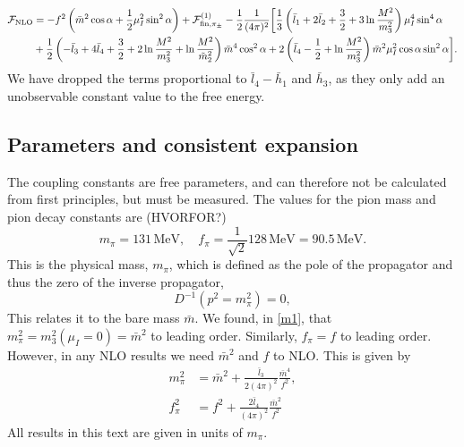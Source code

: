 \begin{align}
    \nonumber
    \Ef_{\mathrm{NLO}} &=
    - f^2 \left(\bar m^2 \cos \alpha + \frac{1}{2}\mu_I^2 \sin^2 \alpha\right)
    + \Ef^{(1)}_{\mathrm{fin}, \pi_\pm}
    - \frac{1}{2}\frac{1}{(4 \pi)^2}
    \bigg[
        \frac{1}{3}
        \left( 
            \bar l_1 + 2 \bar l_2 + \frac{3}{2} + 3 \ln \frac{M^2}{m_3^2}
        \right) \mu_I^4 \sin^4 \alpha
        \\ %
        &
        +
        \frac{1}{2}
        \left(
            - \bar l_3 + 4 \bar l_4 + \frac{3}{2} + 2\ln \frac{M^2}{m_3^2}
            + \ln \frac{M^2}{\tilde m^2_2}
        \right) \bar m^4 \cos^2\alpha 
        + 2 \left(\bar l_4 - \frac{1}{2} + \ln \frac{M^2}{m_3^2}\right)
        \bar m^2 \mu_I^2 \cos\alpha \sin^2 \alpha
        \label{NLO free energy}
    \bigg].
\end{align}
We have dropped the terms proportional to $\bar l_4 - \bar h_1$ and $\bar h_3$, as they only add an unobservable constant value to the free energy.



\subsection*{Parameters and consistent expansion}
The coupling constants are free parameters, and can therefore not be calculated from first principles, but must be measured.
The values for the pion mass and pion decay constants are (HVORFOR?)
\begin{equation}
    m_\pi = 131 \, \mathrm{MeV}, \quad 
    f_\pi = \frac{1}{\sqrt 2} 128 \, \mathrm{MeV} = 90.5 \, \mathrm{MeV}.
\end{equation}
This is the physical mass, $m_\pi$, which is defined as the pole of the propagator and thus the zero of the inverse propagator,
\begin{equation}
    D^{-1}(p^2 = m_\pi^2) = 0,
\end{equation}
This relates it to the bare mass $\bar m$.
We found, in \cref{m1}, that $m_\pi^2 = m_3^2(\mu_I = 0) = \bar m^2$ to leading order.
Similarly, $f_\pi = f$ to leading order.
However, in any NLO results we need $\bar m^2$ and $f$ to NLO.
This is given by~\cite{Gasser-Leutwyler:chiral}
\begin{align}
    \label{equation bare mass}
    m_\pi^2 & = \bar m^2 + \frac{\bar l_3}{2 (4\pi)^2} \frac{\bar m^4}{f^2}, \\
    \label{equation bare decay constant}
    f_\pi^2 & = f^2 + \frac{2\bar l_4}{(4\pi)^2} \frac{\bar m^2}{f^2}
\end{align}
All results in this text are given in units of $m_\pi$.

